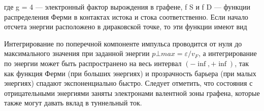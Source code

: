\documentclass[a4paper,12pt]{article} %
\begin{document}
\noindent где g = 4 — электронный фактор вырождения в графене, f S и f D — функции распределения Ферми в контактах истока и стока соответственно. Если начало отсчета энергии расположено в дираковской точке, то эти функции имеют вид
\begin{figure}[h!]
\end{figure}
\noindent Интегрирование по поперечной компоненте импульса проводится от нуля до максимального значения при заданной энергии $p⊥max = ε/v_F$, а интегрирование по энергии может быть распространено на весь интервал $(-\inf, +\inf)$, так как функция Ферми (при больших энергиях) и прозрачность барьера (при малых энергиях) спадают экспоненциально быстро. Следует отметить, что состояния с отрицательными энергиями заняты электронами валентной зоны графена, которые также могут давать вклад в туннельный ток.
\end{document}
